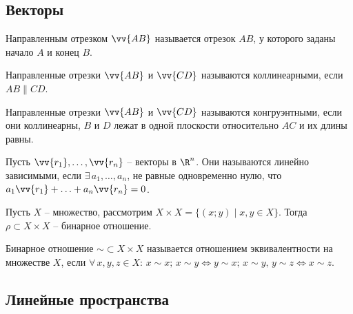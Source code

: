 \documentclass[12pt]{article}
\begin{document}
\subsection{Векторы}

\begin{definition}
    Направленным отрезком $\vv{AB}$ называется отрезок $AB$, у которого заданы начало $A$ и конец $B$.
\end{definition}
\begin{definition}
    Направленные отрезки $\vv{AB}$ и $\vv{CD}$ называются коллинеарными, если $AB\parallel CD$.
\end{definition}
\begin{definition}
    Направленные отрезки $\vv{AB}$ и $\vv{CD}$ называются конгруэнтными, если они коллинеарны, $B$ и $D$ лежат в одной плоскости относительно $AC$ и их длины равны.
\end{definition}
\begin{definition}
    Пусть $\vv{r_1},\ldots,\vv{r_n}$ – векторы в $\R^n$. Они называются линейно зависимыми, если $\exists\,a_1,\ldots,a_n$, не равные одновременно нулю, что $a_1\vv{r_1}+\ldots+a_n\vv{r_n}=0$.
\end{definition}
\begin{definition}
    Пусть $X$ – множество, рассмотрим $X\times X=\{(x;y)\mid x,y\in X\}$. Тогда $\rho\subset X\times X$ – бинарное отношение.
\end{definition}
\begin{definition}
    Бинарное отношение $\sim\subset X\times X$ называется отношением эквивалентности на множестве $X$, если $\forall\,x,y,z\in X:\,x\sim x;\,x\sim y\iff y\sim x;\,x\sim y,\,y\sim z\iff x\sim z$.
\end{definition}

\subsection{Линейные пространства}
\end{document}
